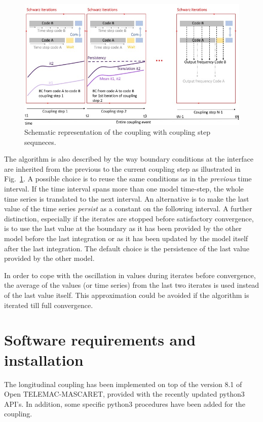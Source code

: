 \begin{figure}[htbp]
    \centering
        \centering \includegraphics[width=12cm]{graphics/schemacoupling_time2.jpeg}
    \caption{Schematic representation of the coupling with coupling step sequneces.}\label{fig:schemacoupling_time2}
\end{figure}
The algorithm is also described by the way boundary
conditions at the interface are inherited from the previous to the
current coupling step as illustrated in Fig.~\ref{fig:schemacoupling_time2}. A
possible choice is to reuse the same
conditions as in the \emph{previous} time interval. If the time
interval spans more than one model time-step, the whole time series is
translated to the next interval. An alternative is to make the last
value of the time series \emph{persist} as a constant on the following
interval. A further distinction, especially if the iterates are stopped
before satisfactory convergence, is to use the last value at the
boundary as it has been provided by the other model before the last
integration or as it has been updated by the model itself after the last
integration. The default choice is the persistence of the last value
provided by the other model.

In order to cope with the oscillation in values during iterates before
convergence, the average of the values (or time series) from the last
two iterates is used instead of the last value itself. This
approximation could be avoided if the algorithm is iterated till full
convergence.

\chapter{Software requirements and installation}

The longitudinal coupling has been implemented on top of the version
8.1 of Open TELEMAC-MASCARET, provided with the recently updated
python3 API's. In addition, some specific python3 procedures have been
added for the coupling.
\newline

